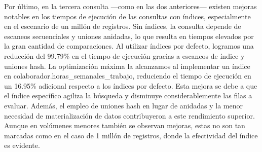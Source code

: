 Por último, en la tercera consulta —como en las dos anteriores— existen mejoras notables en los tiempos de ejecución de las consultas con índices, especialmente en el escenario de un millón de registros. Sin índices, la consulta depende de escaneos secuenciales y uniones anidadas, lo que resulta en tiempos elevados por la gran cantidad de comparaciones. Al utilizar índices por defecto, logramos una reducción del 99.79\% en el tiempo de ejecución gracias a escaneos de índice y uniones hash. La optimización máxima la alcanzamos al implementar un índice en colaborador.horas\_semanales\_trabajo, reduciendo el tiempo de ejecución en un 16.95\% adicional respecto a los índices por defecto. Esta mejora se debe a que el índice específico agiliza la búsqueda y disminuye considerablemente las filas a evaluar. Además, el empleo de uniones hash en lugar de anidadas y la menor necesidad de materialización de datos contribuyeron a este rendimiento superior. Aunque en volúmenes menores también se observan mejoras, estas no son tan marcadas como en el caso de 1 millón de registros, donde la efectividad del índice es evidente.